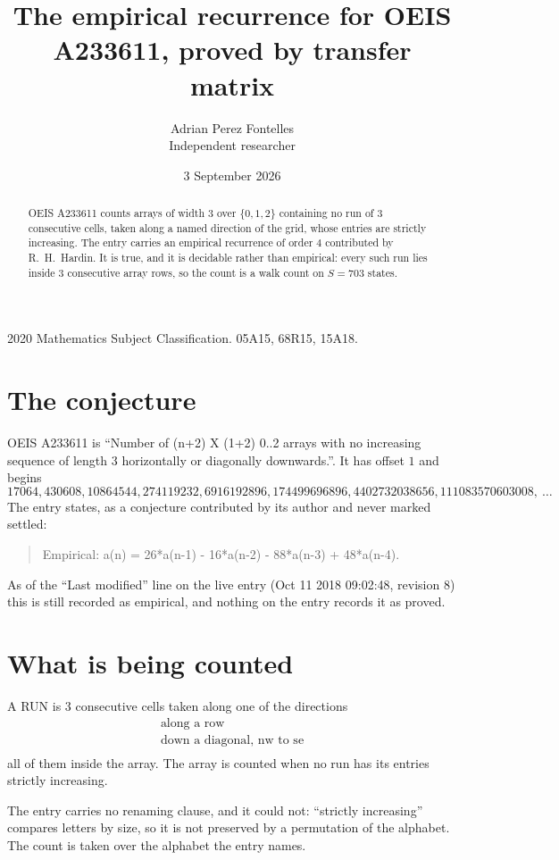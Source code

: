 \documentclass[11pt,a4paper]{article}
\title{The empirical recurrence for OEIS A233611, proved by transfer matrix}
\author{Adrian Perez Fontelles\\ \small Independent researcher}
\date{3 September 2026}
\theoremstyle{plain}
\theoremstyle{definition}
\begin{document}
\maketitle

\begin{abstract}
OEIS A233611 counts arrays of width $3$ over $\{0,1,2\}$ containing no run of $3$ consecutive
cells, taken along a named direction of the grid, whose entries are strictly increasing. The entry carries
an empirical recurrence of order $4$ contributed by R.~H.~Hardin. It is true, and it is
decidable rather than empirical: every such run lies inside $3$ consecutive array rows, so
the count is a walk count on $S=703$ states.
\end{abstract}

\noindent\small 2020 Mathematics Subject Classification. 05A15, 68R15, 15A18.\normalsize

\section{The conjecture}

OEIS A233611 is ``Number of (n+2) X (1+2) 0..2 arrays with no increasing sequence of length 3 horizontally or diagonally downwards.''. It has offset $1$ and begins
\[
17064, 430608, 10864544, 274119232, 6916192896, 174499696896, 4402732038656, 111083570603008,\ \dots
\]
The entry states, as a conjecture contributed by its author and never marked settled:
\begin{quote}
Empirical: a(n) = 26*a(n-1) - 16*a(n-2) - 88*a(n-3) + 48*a(n-4).
\end{quote}
As of the ``Last modified'' line on the live entry (Oct 11 2018 09:02:48, revision 8) this is still
recorded as empirical, and nothing on the entry records it as proved.

\section{What is being counted}

A RUN is $3$ consecutive cells taken along one of the directions
\[
\begin{array}{l}
\text{along a row} \\
\text{down a diagonal, nw to se} \\
\end{array}
\]
all of them inside the array. The array is counted when no run has its entries strictly increasing.


The entry carries no renaming clause, and it could not: ``strictly increasing'' compares
letters by size, so it is not preserved by a permutation of the alphabet. The count is taken
over the alphabet the entry names.
\end{document}
